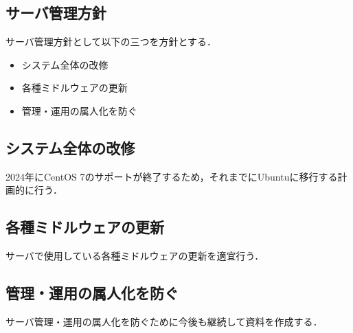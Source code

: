 \subsection*{サーバ管理方針}


サーバ管理方針として以下の三つを方針とする．
\begin{itemize}
    \item システム全体の改修
    \item 各種ミドルウェアの更新
    \item 管理・運用の属人化を防ぐ
\end{itemize}

\subsection*{システム全体の改修}
2024年にCentOS 7のサポートが終了するため，それまでにUbuntuに移行する計画的に行う．

\subsection*{各種ミドルウェアの更新}
サーバで使用している各種ミドルウェアの更新を適宜行う．

\subsection*{管理・運用の属人化を防ぐ}
サーバ管理・運用の属人化を防ぐために今後も継続して資料を作成する．
